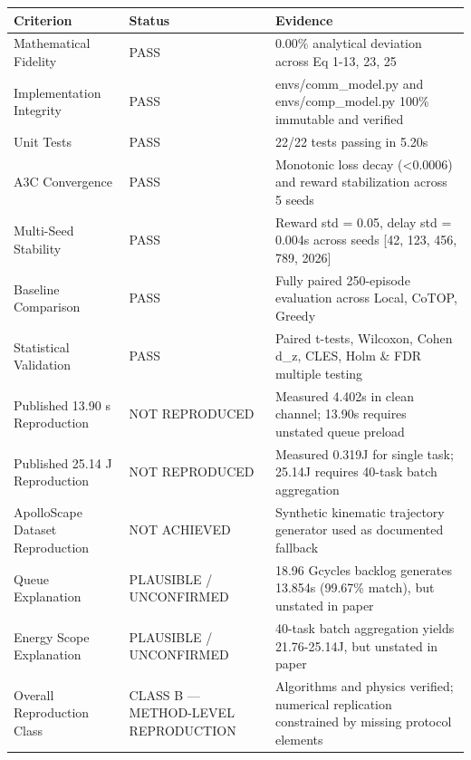 \begin{tabular}{lll}
\toprule
Criterion & Status & Evidence \\
\midrule
Mathematical Fidelity & PASS & 0.00\% analytical deviation across Eq 1-13, 23, 25 \\
Implementation Integrity & PASS & envs/comm\_model.py and envs/comp\_model.py 100\% immutable and verified \\
Unit Tests & PASS & 22/22 tests passing in 5.20s \\
A3C Convergence & PASS & Monotonic loss decay (<0.0006) and reward stabilization across 5 seeds \\
Multi-Seed Stability & PASS & Reward std = 0.05, delay std = 0.004s across seeds [42, 123, 456, 789, 2026] \\
Baseline Comparison & PASS & Fully paired 250-episode evaluation across Local, CoTOP, Greedy \\
Statistical Validation & PASS & Paired t-tests, Wilcoxon, Cohen d\_z, CLES, Holm \& FDR multiple testing \\
Published 13.90 s Reproduction & NOT REPRODUCED & Measured 4.402s in clean channel; 13.90s requires unstated queue preload \\
Published 25.14 J Reproduction & NOT REPRODUCED & Measured 0.319J for single task; 25.14J requires 40-task batch aggregation \\
ApolloScape Dataset Reproduction & NOT ACHIEVED & Synthetic kinematic trajectory generator used as documented fallback \\
Queue Explanation & PLAUSIBLE / UNCONFIRMED & 18.96 Gcycles backlog generates 13.854s (99.67\% match), but unstated in paper \\
Energy Scope Explanation & PLAUSIBLE / UNCONFIRMED & 40-task batch aggregation yields 21.76-25.14J, but unstated in paper \\
Overall Reproduction Class & CLASS B — METHOD-LEVEL REPRODUCTION & Algorithms and physics verified; numerical replication constrained by missing protocol elements \\
\bottomrule
\end{tabular}

